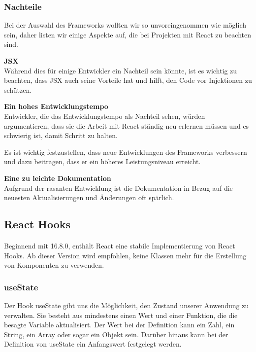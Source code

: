 \subsubsection{Nachteile}
Bei der Auswahl des Frameworks wollten wir so unvoreingenommen wie möglich sein, daher listen wir einige Aspekte auf, die bei Projekten mit React zu beachten sind.
\newline

\textbf{JSX}\\
Während dies für einige Entwickler ein Nachteil sein könnte, ist es wichtig zu beachten, dass JSX auch seine Vorteile hat und hilft, den Code vor Injektionen zu schützen.
\newline

\textbf{Ein hohes Entwicklungstempo}\\
Entwickler, die das Entwicklungstempo als Nachteil sehen, würden argumentieren, dass sie die Arbeit mit React ständig neu erlernen müssen und es schwierig ist, damit Schritt zu halten.

Es ist wichtig festzustellen, dass neue Entwicklungen des Frameworks verbessern und dazu beitragen, dass er ein höheres Leistungsniveau erreicht.
\newline

\textbf{Eine zu leichte Dokumentation}\\
Aufgrund der rasanten Entwicklung ist die Dokumentation in Bezug auf die neuesten Aktualisierungen und Änderungen oft spärlich.{\cite{R01}}

\subsection{React Hooks}
\paragraph{}
Beginnend mit 16.8.0, enthält React eine stabile Implementierung von React Hooks. Ab dieser Version wird empfohlen, keine Klassen mehr für die Erstellung von Komponenten zu verwenden.

\subsubsection{useState}
Der Hook useState gibt uns die Möglichkeit, den Zustand unserer Anwendung zu verwalten. Sie besteht aus mindestens einen Wert und einer Funktion, die die besagte Variable aktualisiert.
Der Wert bei der Definition kann ein Zahl, ein String, ein Array oder sogar ein Objekt sein.
Darüber hinaus kann bei der Definition von useState ein Anfangswert festgelegt werden.


